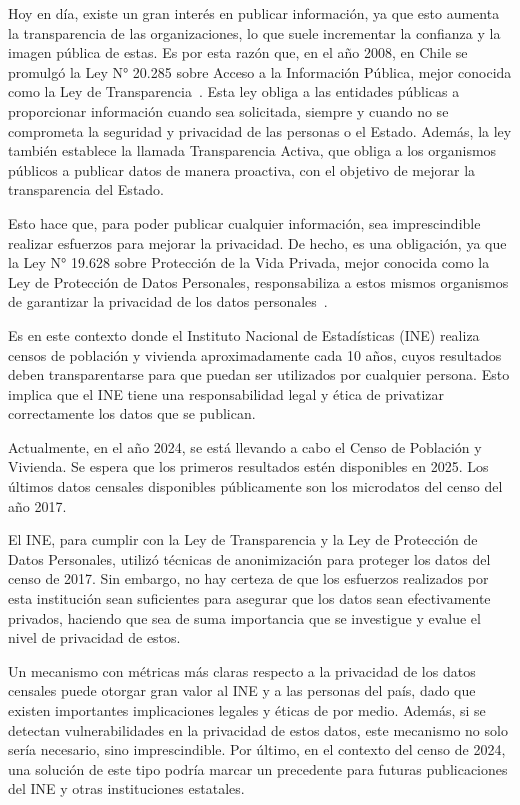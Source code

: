 \documentclass[informe]{upropuesta}
\begin{document}
Hoy en día, existe un gran interés en publicar información, ya que esto aumenta la transparencia de las organizaciones, lo que suele incrementar la confianza y la imagen pública de estas. Es por esta razón que, en el año 2008, en Chile se promulgó la Ley N° 20.285 sobre Acceso a la Información Pública, mejor conocida como la Ley de Transparencia~\cite{LeyTransparencia}. Esta ley obliga a las entidades públicas a proporcionar información cuando sea solicitada, siempre y cuando no se comprometa la seguridad y privacidad de las personas o el Estado. Además, la ley también establece la llamada Transparencia Activa, que obliga a los organismos públicos a publicar datos de manera proactiva, con el objetivo de mejorar la transparencia del Estado.

Esto hace que, para poder publicar cualquier información, sea imprescindible realizar esfuerzos para mejorar la privacidad. De hecho, es una obligación, ya que la Ley N° 19.628 sobre Protección de la Vida Privada, mejor conocida como la Ley de Protección de Datos Personales, responsabiliza a estos mismos organismos de garantizar la privacidad de los datos personales~\cite{LeyProteccionDatos}.

Es en este contexto donde el Instituto Nacional de Estadísticas (INE) realiza censos de población y vivienda aproximadamente cada 10 años, cuyos resultados deben transparentarse para que puedan ser utilizados por cualquier persona. Esto implica que el INE tiene una responsabilidad legal y ética de privatizar correctamente los datos que se publican.

Actualmente, en el año 2024, se está llevando a cabo el Censo de Población y Vivienda. Se espera que los primeros resultados estén disponibles en 2025. Los últimos datos censales disponibles públicamente son los microdatos del censo del año 2017.

El INE, para cumplir con la Ley de Transparencia y la Ley de Protección de Datos Personales, utilizó técnicas de anonimización para proteger los datos del censo de 2017. Sin embargo, no hay certeza de que los esfuerzos realizados por esta institución sean suficientes para asegurar que los datos sean efectivamente privados, haciendo que sea de suma importancia que se investigue y evalue el nivel de privacidad de estos.

Un mecanismo con métricas más claras respecto a la privacidad de los datos censales puede otorgar gran valor al INE y a las personas del país, dado que existen importantes implicaciones legales y éticas de por medio. Además, si se detectan vulnerabilidades en la privacidad de estos datos, este mecanismo no solo sería necesario, sino imprescindible. Por último, en el contexto del censo de 2024, una solución de este tipo podría marcar un precedente para futuras publicaciones del INE y otras instituciones estatales.
\end{document}
